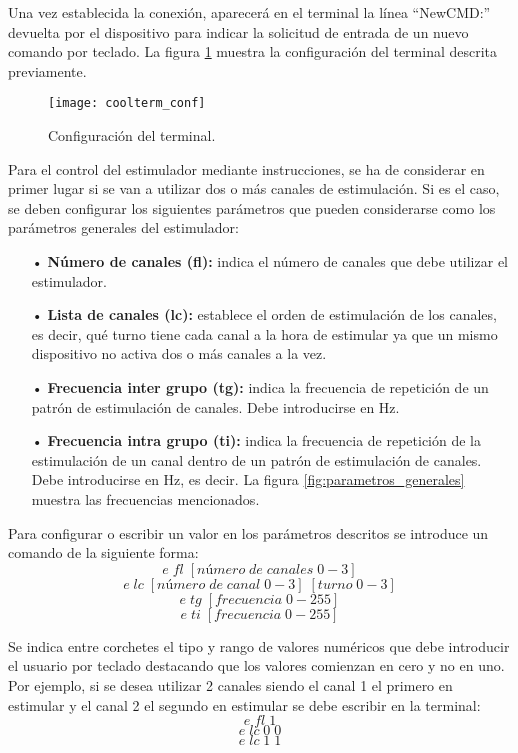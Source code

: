 Una vez establecida la conexión, aparecerá en el terminal la línea ``NewCMD:'' devuelta por el dispositivo para indicar la solicitud de entrada de un nuevo comando por teclado. La figura \ref{fig:coolterm_conf} muestra la configuración del terminal descrita previamente.\\  

\begin{figure}[!htb]
\centering
\texttt{[image: coolterm\_conf]}
  \caption{Configuración del terminal.}\label{fig:coolterm_conf}
\end{figure}


Para el control del estimulador mediante instrucciones, se ha de considerar en primer lugar si se van a utilizar dos o más canales de estimulación. Si es el caso, se deben configurar los siguientes parámetros que pueden considerarse como los parámetros generales del estimulador:

\begin{itemize}
\item[•] \textbf{Número de canales (fl):} indica el número de canales que debe utilizar el estimulador.
\item[•] \textbf{Lista de canales (lc):} establece el orden de estimulación de los canales, es decir, qué turno tiene cada canal a la hora de estimular ya que un mismo dispositivo no activa dos o más canales a la vez. 
\item[•] \textbf{Frecuencia inter grupo (tg):} indica la frecuencia de repetición de un patrón de estimulación de canales. Debe introducirse en Hz.
\item[•] \textbf{Frecuencia intra grupo (ti):} indica la frecuencia de repetición de la estimulación de un canal dentro de un patrón de estimulación de canales. Debe introducirse en Hz, es decir. La figura \ref{fig:parametros_generales} muestra las frecuencias mencionados.
\end{itemize}

Para configurar o escribir un valor en los parámetros descritos se introduce un comando de la siguiente forma:
$$e\;fl\;[número\;de\;canales\;0-3]$$
$$e\;lc\;[número\;de\;canal\;0-3]\;[turno\;0-3]$$
$$e\;tg\;[frecuencia\;0-255]$$
$$e\;ti\;[frecuencia\;0-255]$$

Se indica entre corchetes el tipo y rango de valores numéricos que debe introducir el usuario por teclado destacando que los valores comienzan en cero y no en uno. Por ejemplo, si se desea utilizar 2 canales siendo el canal 1 el primero en estimular y el canal 2 el segundo en estimular se debe escribir en la terminal:
$$e\;fl\;1$$
$$e\;lc\;0\;0$$
$$e\;lc\;1\;1$$

